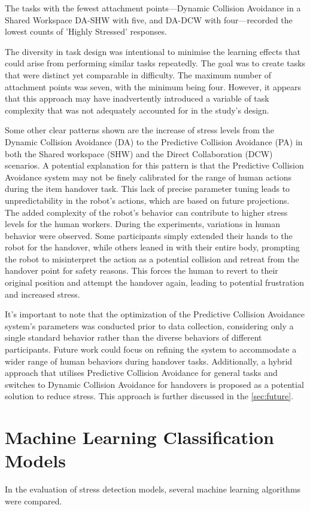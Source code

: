 The tasks with the fewest attachment points—Dynamic Collision Avoidance in a Shared Workspace \gls{DA-SHW} with five, and \gls{DA-DCW} with four—recorded the lowest counts of 'Highly Stressed' responses.

The diversity in task design was intentional to minimise the learning effects that could arise from performing similar tasks repeatedly. The goal was to create tasks that were distinct yet comparable in difficulty. The maximum number of attachment points was seven, with the minimum being four. However, it appears that this approach may have inadvertently introduced a variable of task complexity that was not adequately accounted for in the study's design.

Some other clear patterns shown are the increase of stress levels from the Dynamic Collision Avoidance (DA) to the Predictive Collision Avoidance (PA) in both the Shared workspace (SHW) and the Direct Collaboration (DCW) scenarios. A potential explanation for this pattern is that the Predictive Collision Avoidance system may not be finely calibrated for the range of human actions during the item handover task. This lack of precise parameter tuning leads to unpredictability in the robot's actions, which are based on future projections. The added complexity of the robot's behavior can contribute to higher stress levels for the human workers. During the experiments, variations in human behavior were observed. Some participants simply extended their hands to the robot for the handover, while others leaned in with their entire body, prompting the robot to misinterpret the action as a potential collision and retreat from the handover point for safety reasons. This forces the human to revert to their original position and attempt the handover again, leading to potential frustration and increased stress.

It's important to note that the optimization of the Predictive Collision Avoidance system's parameters was conducted prior to data collection, considering only a single standard behavior rather than the diverse behaviors of different participants. Future work could focus on refining the system to accommodate a wider range of human behaviors during handover tasks. Additionally, a hybrid approach that utilises Predictive Collision Avoidance for general tasks and switches to Dynamic Collision Avoidance for handovers is proposed as a potential solution to reduce stress. This approach is further discussed in the \autoref{sec:future}.


\section{Machine Learning Classification Models} 
In the evaluation of stress detection models, several machine learning algorithms were compared.
